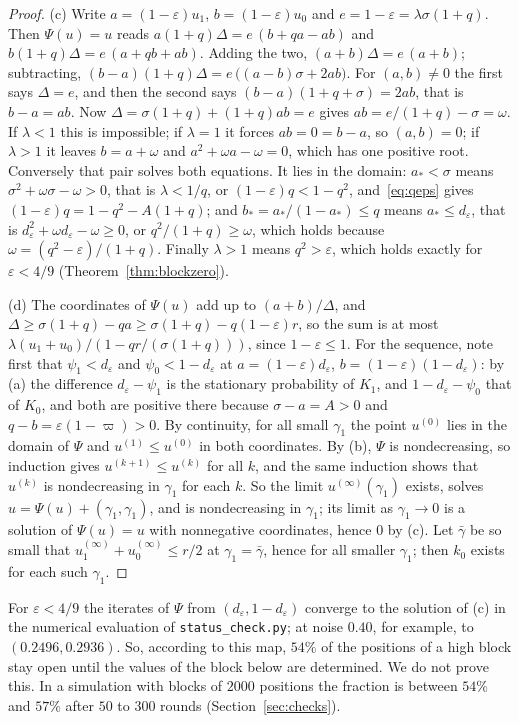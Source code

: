 \documentclass[11pt]{amsart}
\theoremstyle{definition}
\theoremstyle{remark}
\newcommand{\eps}{\varepsilon}
\begin{document}
\begin{proof}
(c) Write $a=(1-\eps)u_1$, $b=(1-\eps)u_0$ and $e=1-\eps=\lambda\sigma(1+q)$. Then
$\Psi(u)=u$ reads $a(1+q)\Delta=e\,(b+qa-ab)$ and $b(1+q)\Delta=e\,(a+qb+ab)$. Adding the two,
$(a+b)\Delta=e\,(a+b)$; subtracting, $(b-a)(1+q)\Delta=e\,\bigl((a-b)\sigma+2ab\bigr)$. For
$(a,b)\ne0$ the first says $\Delta=e$, and then the second says $(b-a)(1+q+\sigma)=2ab$, that is
$b-a=ab$. Now $\Delta=\sigma(1+q)+(1+q)ab=e$ gives $ab=e/(1+q)-\sigma=\omega$. If $\lambda<1$
this is impossible; if $\lambda=1$ it forces $ab=0=b-a$, so $(a,b)=0$; if $\lambda>1$ it leaves
$b=a+\omega$ and $a^2+\omega a-\omega=0$, which has one positive root. Conversely that pair solves
both equations. It lies in the domain: $a_*<\sigma$ means $\sigma^2+\omega\sigma-\omega>0$, that
is $\lambda<1/q$, or $(1-\eps)q<1-q^2$, and~\eqref{eq:qeps} gives $(1-\eps)q=1-q^2-A(1+q)$; and
$b_*=a_*/(1-a_*)\le q$ means $a_*\le d_\eps$, that is $d_\eps^2+\omega d_\eps-\omega\ge0$, or
$q^2/(1+q)\ge\omega$, which holds because $\omega=(q^2-\eps)/(1+q)$. Finally $\lambda>1$ means
$q^2>\eps$, which holds exactly for $\eps<4/9$ (Theorem~\ref{thm:blockzero}).

(d) The coordinates of $\Psi(u)$ add up to $(a+b)/\Delta$, and
$\Delta\ge\sigma(1+q)-qa\ge\sigma(1+q)-q(1-\eps)r$, so the sum is at most
$\lambda(u_1+u_0)/(1-qr/(\sigma(1+q)))$, since $1-\eps\le1$. For the sequence, note first that
$\psi_1<d_\eps$ and $\psi_0<1-d_\eps$ at $a=(1-\eps)d_\eps$, $b=(1-\eps)(1-d_\eps)$: by (a) the difference
$d_\eps-\psi_1$ is the stationary probability of $K_1$, and $1-d_\eps-\psi_0$ that of $K_0$, and both are
positive there because $\sigma-a=A>0$ and $q-b=\eps(1-\varpi)>0$. By continuity, for all small
$\gamma_1$ the point $u^{(0)}$ lies in the domain of $\Psi$ and $u^{(1)}\le u^{(0)}$ in both
coordinates. By (b), $\Psi$ is nondecreasing, so induction gives $u^{(k+1)}\le u^{(k)}$ for all
$k$, and the same induction shows that $u^{(k)}$ is nondecreasing in $\gamma_1$ for each $k$. So
the limit $u^{(\infty)}(\gamma_1)$ exists, solves $u=\Psi(u)+(\gamma_1,\gamma_1)$, and is
nondecreasing in $\gamma_1$; its limit as $\gamma_1\to0$ is a solution of $\Psi(u)=u$ with
nonnegative coordinates, hence $0$ by (c). Let $\bar\gamma$ be so small that
$u^{(\infty)}_1+u^{(\infty)}_0\le r/2$ at $\gamma_1=\bar\gamma$, hence for all smaller
$\gamma_1$; then $k_0$ exists for each such $\gamma_1$.
\end{proof}

\noindent For $\eps<4/9$ the iterates of $\Psi$ from $(d_\eps,1-d_\eps)$ converge to the solution of
(c) in the numerical evaluation of \texttt{status\_check.py}; at noise $0.40$, for example, to
$(0.2496,0.2936)$. So, according to this map, $54\%$ of the positions of a high block stay open
until the values of the block below are determined. We do not prove this. In a simulation with
blocks of $2000$ positions the fraction is between $54\%$ and $57\%$ after $50$ to $300$ rounds
(Section~\ref{sec:checks}).
\end{document}

